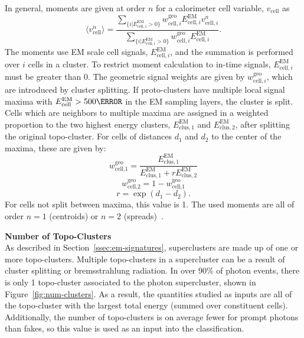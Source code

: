 In general, moments are given at order $n$ for a calorimeter cell variable, $v_{\text{cell}}$ as
\begin{equation}\label{eqn:moment-calculation}
    \langle v_{\text{cell}}^{n} \rangle = \frac{
        \sum_{\{i|E_{\text{cell},i}^{\text{EM}}>0\}}w^{\text{geo}}_{\text{cell},i} E_{\text{cell},i}^{\text{EM}} v_{\text{cell},i}^{n}
    }
    {
        \sum_{\{i|E_{\text{cell},i}^{\text{EM}}>0\}}w^{\text{geo}}_{\text{cell},i} E_{\text{cell},i}^{\text{EM}}
    }.
\end{equation}
The moments use \gls{EM} scale cell signals, $E_{\text{cell},i}^{\text{EM}}$, and the summation is performed over $i$ cells in a cluster. To restrict moment calculation to in-time signals, $E_{\text{cell},i}^{\text{EM}}$ must be greater than 0. The geometric signal weights are given by $w^{\text{geo}}_{\text{cell},i}$, which are introduced by cluster splitting. If proto-clusters have multiple local signal maxima with $E_{\text{cell}}^{\text{EM}} > \unit{500}{\MeV}$ in the \gls{EM} sampling layers, the cluster is split. Cells which are neighbors to multiple maxima are assigned in a weighted proportion to the two highest energy clusters, $E_{\text{clus},1}^{\text{EM}}$ and $E_{\text{clus},2}^{\text{EM}}$, after splitting the original topo-cluster. For cells of distances $d_1$ and $d_2$ to the center of the maxima, these are given by: 
\begin{equation}
    w^{\text{geo}}_{\text{cell,1}} = \frac{E_{\text{clus},1}^{\text{EM}}}{E_{\text{clus},1}^{\text{EM}} + r E_{\text{clus},2}^{\text{EM}}}
\end{equation}
\begin{equation}
    w^{\text{geo}}_{\text{cell,2}} = 1-w^{\text{geo}}_{\text{cell,1}}
\end{equation}
\begin{equation}
    r = \exp(d_1 -d_2).
\end{equation}
For cells not split between maxima, this value is 1. The used moments are all of order $n=1$ (centroids) or $n=2$ (spreads)~\cite{topo-cluster}.

\noindent\textbf{Number of Topo-Clusters}\\
\indent As described in Section~\ref{ssec:em-signatures}, superclusters are made up of one or more topo-clusters. Multiple topo-clusters in a supercluster can be a result of cluster splitting or bremsstrahlung radiation. In over 90\% of photon events, there is only 1 topo-cluster associated to the photon supercluster, shown in Figure~\ref{fig:num-clusters}. As a result, the quantities studied as inputs are all of the topo-cluster with the largest total energy (summed over constituent cells). Additionally, the number of topo-clusters is on average fewer for prompt photons than fakes, so this value is used as an input into the classification.


